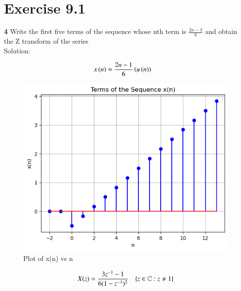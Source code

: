 \documentclass[journal,12pt,twocolumn]{IEEEtran}
\theoremstyle{remark}
\begin{document}


\vspace{3cm}

\title{}
\author{EE23BTECH11047 - Deepakreddy P
}
\maketitle
\newpage
\bigskip

\section*{Exercise 9.1}

\noindent \textbf{4} \hspace{2pt} Write the first five terms of the sequence whose nth term is $\frac{2n-3}{6}$ and obtain the Z transform of the series\\
\noindent Solution:

\begin{align}
x \left(n\right) &= \frac{2n-1}{6} \left(u\left(n\right)\right)
\label{x(n)}
\end{align}

\begin{figure}[h]
   \centering
   \includegraphics[width=1\columnwidth]{figs/plot.png}
   \caption{Plot of x(n) vs n}
   \label{fig: 9.1.4.1}
\end{figure}

\begin{align}
X(z) &= {\frac{3z^{-1}-1}{6(1-z^{-1})^{2}}}&\left\{z\in\mathbb{C} : z \neq 1\right\} 
\end{align}

\end{document}
